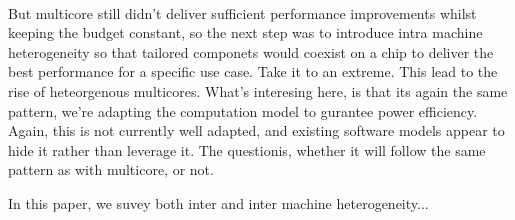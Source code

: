 \paragraph{} But multicore still didn't deliver sufficient performance improvements whilst keeping the budget constant, so the next step was to introduce intra machine heterogeneity so that tailored componets would coexist on a chip to deliver the best performance for a specific use case. Take it to an extreme.
This lead to the rise of heteorgenous multicores. What's interesing here, is that its again the same pattern, we're adapting the computation model to gurantee power efficiency. Again, this is not currently well adapted, and existing software models appear to hide it rather than leverage it. The questionis, whether it will follow the same pattern as with multicore, or not. 

In this paper, we suvey both inter and inter machine heterogeneity... 

